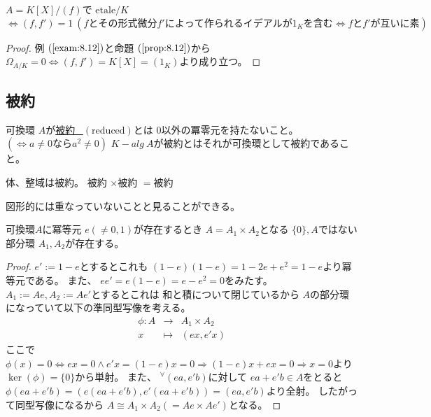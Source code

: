\documentclass[../master_galois_theory]{subfiles}
\begin{document}
\begin{corl} \label{corl:8.12}
  $A = K[X]/(f)$で $\mathrm{etale}/K$ $\Leftrightarrow (f,f') = 1 \  (fとその形式微分 f'によって作られるイデアルが 1_Kを含む \Leftrightarrow fとf'が互いに素)$
\end{corl}

\begin{proof}
  例 $(\mathrm{\ref{exam:8.12}})$と命題 $(\mathrm{\ref{prop:8.12}})$から
  $\Omega_{A/K} = 0 \Leftrightarrow  (f,f') = K[X] = (1_K)$より成り立つ。
\end{proof}

\subsection{被約}

\begin{defi}
  可換環 $A$が\underline{被約 \  $(\mathrm{reduced})$}とは
  $0$以外の冪零元を持たないこと。 $(\Leftrightarrow a \neq 0 なら a^2 \neq 0)$
  $K-alg \  A$が被約とはそれが可換環として被約であること。
\end{defi}

\begin{exam}
  体、整域は被約。
  被約 $\times$被約 $=$被約

  図形的には重なっていないことと見ることができる。
\end{exam}

\begin{lemm} \label{lemm:idempotent}
  可換環$A$に冪等元 $e (\neq 0 , 1)$が存在するとき
  $A = A_1 \times A_2$となる $\{ 0 \} , A$ではない
  部分環 $A_1 , A_2$が存在する。
\end{lemm}

\begin{proof}
  $e' := 1 - e$とするとこれも
  $(1 - e)(1 - e) = 1 - 2e + e^2 = 1 - e$より冪等元である。
  また、 $e e' = e (1 - e) = e - e^2 = 0$をみたす。
  $A_1 := Ae , A_2 := Ae'$とするとこれは 和と積について閉じているから
  $A$の部分環になっていて以下の準同型写像を考える。
  \begin{eqnarray*}
    \phi : A & \longrightarrow & A_1 \times A_2 \\
    x & \longmapsto & (ex , e'x)
  \end{eqnarray*}
  ここで $\phi(x) = 0 \Leftrightarrow ex = 0 \land e'x = (1 - e)x = 0 \Rightarrow (1 - e)x + ex = 0 \Rightarrow x = 0$より $\ker(\phi) = \{ 0 \}$から単射。
  また、 ${}^\forall (ea , e'b)$に対して
  $ea + e'b \in A$をとると
  $\phi(ea + e'b) = (e(ea + e'b) , e'(ea + e'b) ) = (ea , e'b)$より全射。
  したがって同型写像になるから $A \cong A_1 \times A_2 (= Ae \times Ae')$となる。
\end{proof}
\end{document}
